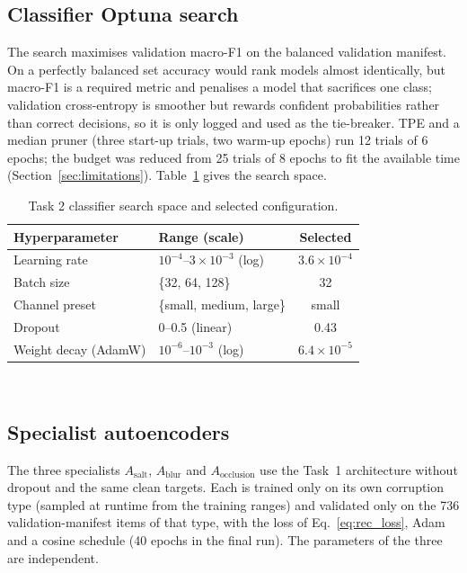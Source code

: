 \documentclass[conference]{IEEEtran}
\begin{document}
\subsection{Classifier Optuna search}
The search maximises validation macro-F1 on the balanced validation
manifest. On a perfectly balanced set accuracy would rank models almost
identically, but macro-F1 is a required metric and penalises a model that
sacrifices one class; validation cross-entropy is smoother but rewards
confident probabilities rather than correct decisions, so it is only logged
and used as the tie-breaker. TPE and a median pruner (three start-up trials,
two warm-up epochs) run 12 trials of 6 epochs; the budget was reduced from
25 trials of 8 epochs to fit the available time (Section~\ref{sec:limitations}). Table~\ref{tab:task2_cls_space}
gives the search space.

\begin{table}[t]
\centering
\caption{Task 2 classifier search space and selected configuration.}
\label{tab:task2_cls_space}
\footnotesize
\begin{tabular}{llc}
\toprule
Hyperparameter & Range (scale) & Selected \\
\midrule
Learning rate & $10^{-4}$--$3\times10^{-3}$ (log) & $3.6\times10^{-4}$ \\
Batch size & \{32, 64, 128\} & 32 \\
Channel preset & \{small, medium, large\} & small \\
Dropout & 0--0.5 (linear) & 0.43 \\
Weight decay (AdamW) & $10^{-6}$--$10^{-3}$ (log) & $6.4\times10^{-5}$ \\
\bottomrule
\end{tabular}
\\[3pt]
\end{table}

\subsection{Specialist autoencoders}
The three specialists $A_{\mathrm{salt}}$, $A_{\mathrm{blur}}$ and
$A_{\mathrm{occlusion}}$ use the Task~1 architecture without dropout and
the same clean targets. Each is trained only on its own corruption type
(sampled at runtime from the training ranges) and validated only on the 736
validation-manifest items of that type, with the loss of
Eq.~\eqref{eq:rec_loss}, Adam and a cosine schedule (40 epochs in the final
run). The parameters of the three are independent.
\end{document}
